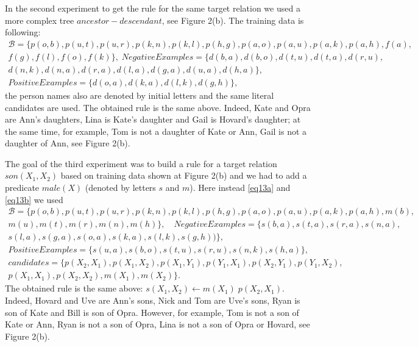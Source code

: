 \documentclass{scrartcl}
\begin{document}
In the second experiment to get the rule for the same target relation we used a more complex tree $ancestor-descendant$,  see Figure 2(b). The training data is following:
\begin{multline}\label{eq14}
\!\!\!\!\mathcal{B}=\! \{p(o, b), p(u, t), p(u, r), p(k, n), p(k, l), p(h, g), p(a, o), p(a, u), p(a, k), p(a, h),
f(a),\\
f(g), f(l), f(o), f(k)\}, \;
NegativeExamples=\!\! \{d(b, a), d(b, o), d(t, u), d(t, a), d(r, u), \\
d(n,k), d(n,a), d(r, a), d(l, a), d(g, a), d(u, a), d(h, a) \},\\
PositiveExamples= \{d(o, a), d(k, a), d(l, k), d(g, h) \},
\end{multline}
the person names also are denoted by initial letters and the same literal candidates are used.
The obtained rule is the same above. Indeed, Kate and Opra are Ann's daughters, Lina is Kate's daughter and Gail is Hovard's daughter; at the same time, for example, Tom is not a daughter of Kate or Ann,  Gail is not a daughter of Ann,  see Figure 2(b).

The goal of the third experiment was to build a rule for a target relation $son(X_1, X_2)$  based on training data shown at Figure 2(b) and we had to add a predicate $male(X)$ (denoted by letters $s$ and $m$). Here instead \eqref{eq13a} and \eqref{eq13b} we used
\begin{multline}\label{eq15}
\!\!\!\!\mathcal{B}=\! \{p(o, b), p(u, t), p(u, r), p(k, n), p(k, l), p(h, g), p(a, o), p(a, u), p(a, k), p(a, h),
m(b),\\m(u),m(t),m(r),m(n),m(h)\},\quad NegativeExamples= \{s(b, a), s(t, a), s(r, a), s(n, a),\\ s(l, a), s(g, a), s(o, a), s(k, a), s(l, k), s(g, h))\},\\
PositiveExamples= \{s(u, a), s(b, o), s(t, u), s(r, u), s(n, k), s(h, a)\},\\
candidates=\{
p(X_2, X_1), p(X_1, X_2), p(X_1, Y_1), p(Y_1, X_1), p(X_2, Y_1), p(Y_1, X_2),\\ p(X_1, X_1), p(X_2, X_2), m(X_1),m(X_2)\}.
\end{multline}
The obtained rule is the same above: $s(X_1, X_2)\leftarrow m(X_1)\; p(X_2, X_1)$. Indeed, Hovard and Uve are Ann's sons, Nick and Tom are Uve's sons,  Ryan is son of Kate and Bill is son of Opra. However, for example, Tom is not a son of Kate or Ann,  Ryan is not a son of Opra, Lina is not a son of Opra or Hovard,  see Figure 2(b).
\end{document}
